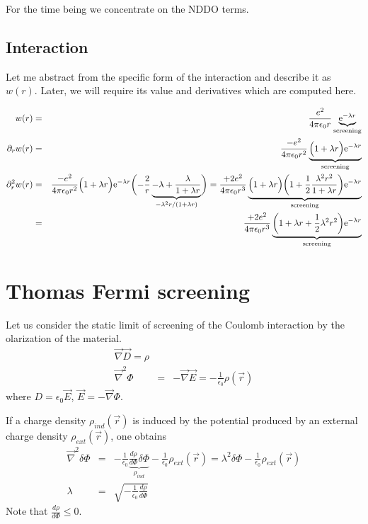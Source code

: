 \documentclass[11pt,a4paper]{report}
\begin{document}
For the time being we concentrate on the NDDO terms.

\subsection{Interaction}
Let me abstract from the specific form of the interaction and describe
it as $w(r)$. Later, we will require its value and derivatives which
are computed here.



\begin{eqnarray}
w(r)&=&\frac{e^2}{4\pi\epsilon_0r}
\underbrace{\mathrm{e}^{-\lambda r}}_{\text{screening}}
\nonumber\\
\partial_rw(r)&=&
\frac{-e^2}{4\pi\epsilon_0 r^2}
\underbrace{
\Bigl(1+\lambda r\Bigr)\mathrm{e}^{-\lambda r}
}_{\text{screening}}
\nonumber\\
\partial^2_rw(r)
&=&
\frac{-e^2}{4\pi\epsilon_0 r^2}
\Bigl(1+\lambda r\Bigr)\mathrm{e}^{-\lambda r}
\biggl(-\frac{2}{r}
\underbrace{
-\lambda+\frac{\lambda}{1+\lambda r}
}_{-\lambda^2r/(1+\lambda r)}
\biggr)
=\frac{+2e^2}{4\pi\epsilon_0 r^3}
\underbrace{
\Bigl(1+\lambda r\Bigr)
\biggl(1+\frac{1}{2}\frac{\lambda^2r^2}{1+\lambda r}\biggr)
\mathrm{e}^{-\lambda r}
}_{\text{screening}}
\nonumber\\
&=&
\frac{+2e^2}{4\pi\epsilon_0 r^3}
\underbrace{
\biggl(1+\lambda r+\frac{1}{2}\lambda^2r^2\biggr)
\mathrm{e}^{-\lambda r}
}_{\text{screening}}
\end{eqnarray}

\section{Thomas Fermi screening}

Let us consider the static limit of screening of the Coulomb
interaction by the olarization of the material.
\begin{eqnarray}
\vec{\nabla}\vec{D}=\rho
\nonumber\\
\vec{\nabla}^2\Phi&=&-\vec{\nabla}\vec{E}=-\frac{1}{\epsilon_0}\rho(\vec{r})
\end{eqnarray}
where 
$D=\epsilon_0\vec{E}$, $\vec{E}=-\vec{\nabla}\Phi$.

If a charge density $\rho_{ind}(\vec{r})$ is induced by the potential
produced by an external charge density $\rho_{ext}(\vec{r})$, one
obtains
\begin{eqnarray}
\vec{\nabla}^2\delta\Phi&=&
-\frac{1}{\epsilon_0}\underbrace{\frac{d\rho}{d\Phi}\delta\Phi}_{\rho_{ind}}
-\frac{1}{\epsilon_0}\rho_{ext}(\vec{r})
=\lambda^2\delta\Phi-\frac{1}{\epsilon_0}\rho_{ext}(\vec{r})
\nonumber\\
\lambda&=&\sqrt{-\frac{1}{\epsilon_0}\frac{d\rho}{d\Phi}}
\end{eqnarray}
Note that $\frac{d\rho}{d\Phi}\le0$.
\end{document}
